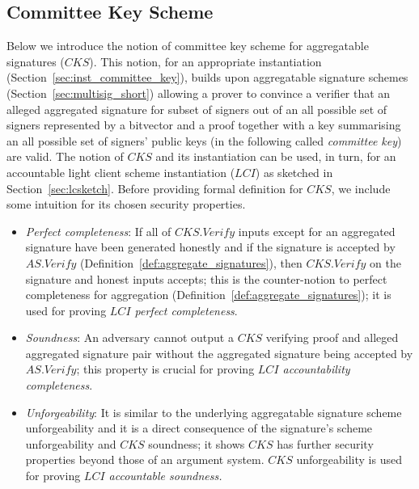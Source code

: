 \subsection{Committee Key Scheme}
\label{sec:committee_key}
Below we introduce the notion of committee key scheme for aggregatable signatures ($\mathit{CKS}$). 
This notion, for an appropriate instantiation (Section~\ref{sec:inst_committee_key}),  
builds upon aggregatable signature schemes (Section~\ref{sec:multisig_short}) allowing a prover to convince a verifier that an alleged aggregated signature 
for subset of signers out of an all possible set of signers represented by a bitvector and a proof together with a key summarising an all possible set of signers' 
public keys (in the following called \emph{committee key}) are valid. The notion of $\mathit{CKS}$ and its instantiation can be used, in turn, for an accountable 
light client scheme instantiation ($\mathit{LCI}$) as sketched in Section~\ref{sec:lcsketch}. Before providing formal definition for $\mathit{CKS}$, 
we include some intuition for its chosen security properties.  
\begin{itemize}
\item \emph{Perfect completeness}: If all of $\mathit{CKS.Verify}$ inputs except for an aggregated signature have been generated honestly and if the signature is accepted 
by $\mathit{AS.Verify}$ (Definition~\ref{def:aggregate_signatures}), then $\mathit{CKS.Verify}$ on the signature and honest inputs accepts; this is the counter-notion to perfect completeness for aggregation 
(Definition~\ref{def:aggregate_signatures}); it is used for proving \emph{$\mathit{LCI}$ perfect completeness}. 
\item \emph{Soundness}: An adversary cannot output a $\mathit{CKS}$ verifying proof and alleged aggregated signature pair without the aggregated signature being accepted 
by $\mathit{AS.Verify}$; this property is crucial for proving \emph{$\mathit{LCI}$ accountability completeness}. 
\item \emph{Unforgeability}: It is similar to the underlying aggregatable signature scheme unforgeability 
and it is a direct consequence of the signature's scheme unforgeability and $\mathit{CKS}$ soundness; 
it shows $\mathit{CKS}$ has further security properties beyond those of an argument system. $\mathit{CKS}$ unforgeability 
is used for proving \emph{$\mathit{LCI}$ accountable soundness.}
\end{itemize}
\vspace{-0.1in}
